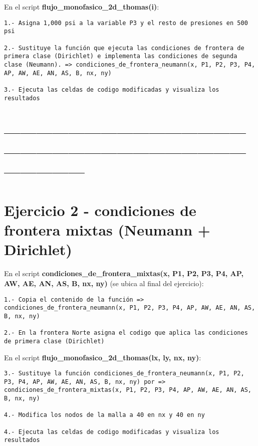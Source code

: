 \documentclass[
  letterpaper,
  DIV=11,
  numbers=noendperiod]{scrreprt}
\begin{document}
En el script \textbf{flujo\_monofasico\_2d\_thomas(i)}:

\begin{verbatim}
1.- Asigna 1,000 psi a la variable P3 y el resto de presiones en 500 psi

2.- Sustituye la función que ejecuta las condiciones de frontera de primera clase (Dirichlet) e implementa las condiciones de segunda clase (Neumann). => condiciones_de_frontera_neumann(x, P1, P2, P3, P4, AP, AW, AE, AN, AS, B, nx, ny)

3.- Ejecuta las celdas de codigo modificadas y visualiza los resultados
\end{verbatim}

\section{---------------------------------------------------------------------------------------------------------}\label{section}

\section{Ejercicio 2 - condiciones de frontera mixtas (Neumann +
Dirichlet)}\label{ejercicio-2---condiciones-de-frontera-mixtas-neumann-dirichlet}

En el script \textbf{condiciones\_de\_frontera\_mixtas(x, P1, P2, P3,
P4, AP, AW, AE, AN, AS, B, nx, ny)} (se ubica al final del ejercicio):

\begin{verbatim}
1.- Copia el contenido de la función => condiciones_de_frontera_neumann(x, P1, P2, P3, P4, AP, AW, AE, AN, AS, B, nx, ny)

2.- En la frontera Norte asigna el codigo que aplica las condiciones de primera clase (Dirichlet)
\end{verbatim}

En el script \textbf{flujo\_monofasico\_2d\_thomas(lx, ly, nx, ny)}:

\begin{verbatim}
3.- Sustituye la función condiciones_de_frontera_neumann(x, P1, P2, P3, P4, AP, AW, AE, AN, AS, B, nx, ny) por => condiciones_de_frontera_mixtas(x, P1, P2, P3, P4, AP, AW, AE, AN, AS, B, nx, ny)

4.- Modifica los nodos de la malla a 40 en nx y 40 en ny

4.- Ejecuta las celdas de codigo modificadas y visualiza los resultados
\end{verbatim}
\end{document}
